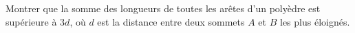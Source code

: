 Montrer que la somme des longueurs de toutes les arêtes d'un polyèdre est supérieure à $3d$, où $d$ est la distance entre deux sommets $A$ et $B$ les plus éloignés.

